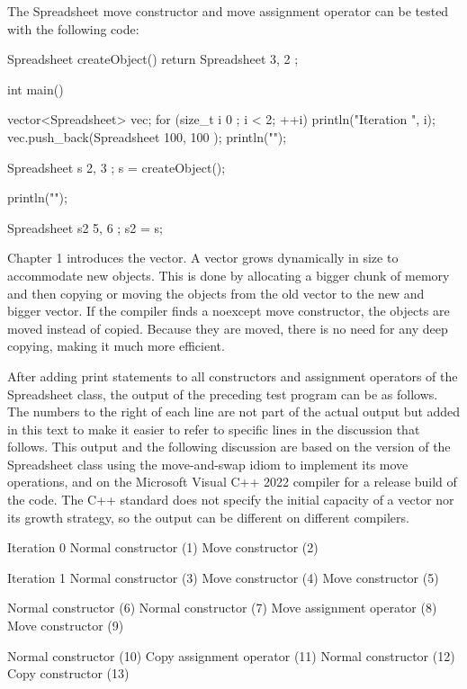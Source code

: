 
The Spreadsheet move constructor and move assignment operator can be tested with the following code:

\begin{cpp}
Spreadsheet createObject()
{
    return Spreadsheet { 3, 2 };
}

int main()
{
    vector<Spreadsheet> vec;
    for (size_t i { 0 }; i < 2; ++i) {
        println("Iteration {}", i);
        vec.push_back(Spreadsheet { 100, 100 });
        println("");
    }

    Spreadsheet s { 2, 3 };
    s = createObject();

    println("");

    Spreadsheet s2 { 5, 6 };
    s2 = s;
}
\end{cpp}

Chapter 1 introduces the vector. A vector grows dynamically in size to accommodate new objects. This is done by allocating a bigger chunk of memory and then copying or moving the objects from the old vector to the new and bigger vector. If the compiler finds a noexcept move constructor, the objects are moved instead of copied. Because they are moved, there is no need for any deep copying, making it much more efficient.

After adding print statements to all constructors and assignment operators of the Spreadsheet class, the output of the preceding test program can be as follows. The numbers to the right of each line are not part of the actual output but added in this text to make it easier to refer to specific lines in the discussion that follows. This output and the following discussion are based on the version of the Spreadsheet class using the move-and-swap idiom to implement its move operations, and on the Microsoft Visual C++ 2022 compiler for a release build of the code. The C++ standard does not specify the initial capacity of a vector nor its growth strategy, so the output can be different on different compilers.

\begin{shell}
Iteration 0
Normal constructor          (1)
Move constructor            (2)

Iteration 1
Normal constructor          (3)
Move constructor            (4)
Move constructor            (5)

Normal constructor          (6)
Normal constructor          (7)
Move assignment operator    (8)
Move constructor            (9)

Normal constructor         (10)
Copy assignment operator   (11)
Normal constructor         (12)
Copy constructor           (13)
\end{shell}

